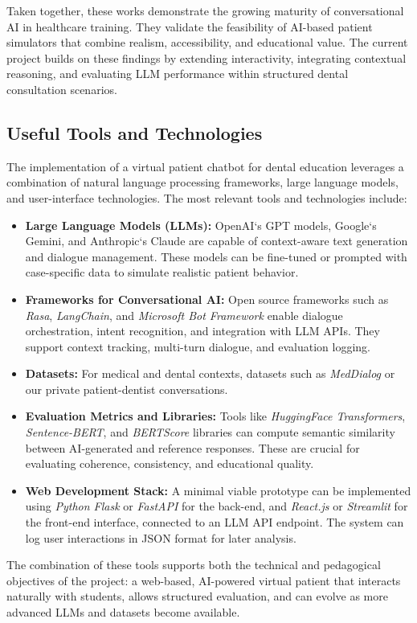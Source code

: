 \documentclass[runningheads,a4paper,11pt]{report}
\begin{document}
Taken together, these works demonstrate the growing maturity of conversational AI in healthcare training. They validate the feasibility of AI-based patient simulators that combine realism, accessibility, and educational value. The current project builds on these findings by extending interactivity, integrating contextual reasoning, and evaluating LLM performance within structured dental consultation scenarios.

\subsection{Useful Tools and Technologies}

The implementation of a virtual patient chatbot for dental education leverages a combination of natural language processing frameworks, large language models, and user-interface technologies. The most relevant tools and technologies include:

\begin{itemize}
  \item \textbf{Large Language Models (LLMs):} OpenAI`s GPT models, Google`s Gemini, and Anthropic`s Claude are capable of context-aware text generation and dialogue management. These models can be fine-tuned or prompted with case-specific data to simulate realistic patient behavior.
  \item \textbf{Frameworks for Conversational AI:} Open source frameworks such as \emph{Rasa}, \emph{LangChain}, and \emph{Microsoft Bot Framework} enable dialogue orchestration, intent recognition, and integration with LLM APIs. They support context tracking, multi-turn dialogue, and evaluation logging.
  \item \textbf{Datasets:} For medical and dental contexts, datasets such as \emph{MedDialog} or our private patient-dentist conversations.
  \item \textbf{Evaluation Metrics and Libraries:} Tools like \emph{HuggingFace Transformers}, \emph{Sentence-BERT}, and \emph{BERTScore} libraries can compute semantic similarity between AI-generated and reference responses. These are crucial for evaluating coherence, consistency, and educational quality.
  \item \textbf{Web Development Stack:} A minimal viable prototype can be implemented using \emph{Python Flask} or \emph{FastAPI} for the back-end, and \emph{React.js} or \emph{Streamlit} for the front-end interface, connected to an LLM API endpoint. The system can log user interactions in JSON format for later analysis.
\end{itemize}

The combination of these tools supports both the technical and pedagogical objectives of the project: a web-based, AI-powered virtual patient that interacts naturally with students, allows structured evaluation, and can evolve as more advanced LLMs and datasets become available.





\end{document}
